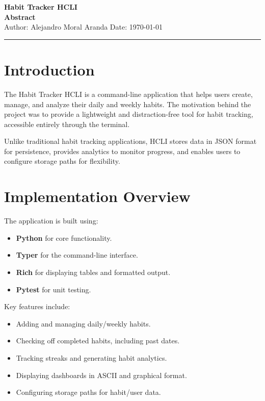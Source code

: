 \documentclass[a4paper,12pt]{article}
\begin{document}
\begin{center}
    {\LARGE \textbf{Habit Tracker HCLI}}\\[0.5cm]
    {\Large \textbf{Abstract}}\\[0.3cm]
    {\small Author: Alejandro Moral Aranda \hspace{1cm} Date: \today}
    \hrule
\end{center}

\section{Introduction}
The Habit Tracker HCLI is a command-line application that helps users create, manage, and analyze their daily and weekly habits. The motivation behind the project was to provide a lightweight and distraction-free tool for habit tracking, accessible entirely through the terminal. 

Unlike traditional habit tracking applications, HCLI stores data in JSON format for persistence, provides analytics to monitor progress, and enables users to configure storage paths for flexibility.

\section{Implementation Overview}
The application is built using:
\begin{itemize}
    \item \textbf{Python} for core functionality.
    \item \textbf{Typer} for the command-line interface.
    \item \textbf{Rich} for displaying tables and formatted output.
    \item \textbf{Pytest} for unit testing.
\end{itemize}

Key features include:
\begin{itemize}
    \item Adding and managing daily/weekly habits.
    \item Checking off completed habits, including past dates.
    \item Tracking streaks and generating habit analytics.
    \item Displaying dashboards in ASCII and graphical format.
    \item Configuring storage paths for habit/user data.
\end{itemize}
\end{document}
